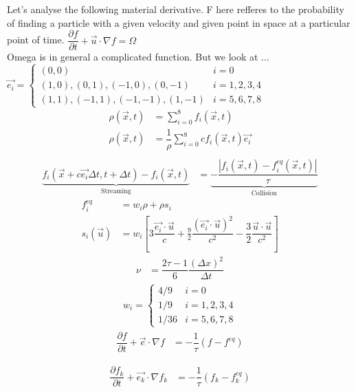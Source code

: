\documentclass[12pt,a4paper]{report}
\begin{document}
	Let's analyse the following material derivative. F here refferes to the probability of finding a particle with a given velocity 
	and given point in space at a particular point of time. 
	$
	\dfrac{\partial f}{\partial t} +\vec{u}\cdot \nabla f = \Omega
	$\\
	
	Omega is in general a complicated function. But we look at ...
	$
	\vec{e_{i}} = 
	\begin{cases}
		(0,0) & i = 0\\
		(1,0),(0,1),(-1,0),(0,-1) & i = 1,2,3,4\\
		(1,1),(-1,1),(-1,-1),(1,-1) & i = 5,6,7,8
	\end{cases}
	$
	\begin{align}
		\rho(\vec{x},t) &= \sum_{i=0}^{8} f_{i}(\vec{x},t)\\
		\rho(\vec{x},t) &= \dfrac{1}{\rho}\sum_{i=0}^{8} cf_{i}(\vec{x},t)\vec{e_i}\\		
	\end{align}
	\begin{align}
		\underbrace{f_i\left(\vec{x} + c\vec{e_i}\Delta t, t+\Delta t\right) - f_i\left(\vec{x}, t\right)}_{\text{Streaming}} &= \underbrace{ -\dfrac{|f_i\left(\vec{x},t\right) - f^{eq}_i\left(\vec{x},t\right)|}{\tau}}_{\text{Collision}}
	\end{align}
	\begin{align}
		f^{eq}_i &= w_i\rho + \rho s_i\\
		s_i(\vec{u}) &= w_i\left[3\dfrac{\vec{e_i}\cdot \vec{u}}{c} + \frac{9}{2}\dfrac{(\vec{e_i}\cdot \vec{u})^2}{c^2} - \dfrac{3}{2}\dfrac{\vec{u}\cdot\vec{u}}{c^2}\right] 
	\end{align}
	\begin{align}
		\nu &= \dfrac{2\tau - 1}{6}\dfrac{(\Delta x)^2}{\Delta t} 
	\end{align}
	\begin{align}
		w_i = 
		\begin{cases}
			4/9  & i = 0\\
			1/9  & i = 1,2,3,4\\
			1/36 & i = 5,6,7,8
		\end{cases}
	\end{align}
	\begin{align}
		\dfrac{\partial f}{\partial t} + \vec{e}\cdot\nabla f &= -\dfrac{1}{\tau}\left(f - f^{eq}\right)
	\end{align}

	\begin{align}
		\dfrac{\partial f_k}{\partial t} + \vec{e_k}\cdot\nabla f_k &= -\dfrac{1}{\tau}\left(f_k - f^{eq}_k\right)
	\end{align}
	
\end{document}
